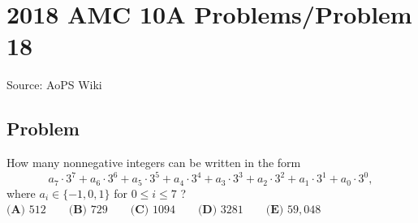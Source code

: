 \documentclass[12pt]{article}
\begin{document}
\section*{{2018 AMC 10A Problems/Problem 18}}
Source: AoPS Wiki

\subsection*{Problem}
How many nonnegative integers can be written in the form \[a_7\cdot3^7+a_6\cdot3^6+a_5\cdot3^5+a_4\cdot3^4+a_3\cdot3^3+a_2\cdot3^2+a_1\cdot3^1+a_0\cdot3^0,\] where $a_i\in \{-1,0,1\}$ for $0\le i \le 7$ ? $\textbf{(A) } 512 \qquad \textbf{(B) } 729 \qquad \textbf{(C) } 1094 \qquad \textbf{(D) } 3281 \qquad \textbf{(E) } 59,048$
\end{document}
